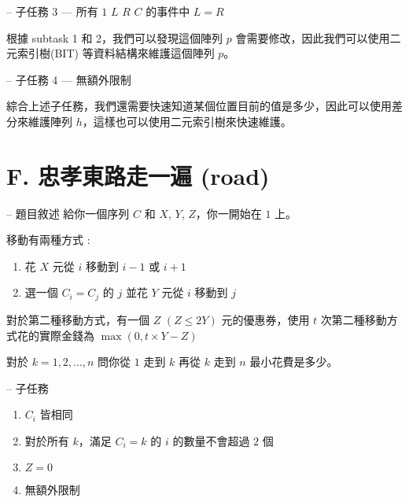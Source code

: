\documentclass[hyperref,UTF8,notheorems,xcolor={dvipsnames}]{beamer}
\newcommand{\btitle}[1]{{\secname} -- #1}
\theoremstyle{definition}
\begin{document}
\begin{frame}[fragile]{\btitle{子任務 3 --- 所有 $1$ $L$ $R$ $C$ 的事件中 $L = R$}}
	
	根據 subtask 1 和 2，我們可以發現這個陣列 $p$ 會需要修改，因此我們可以使用二元索引樹(BIT) 等資料結構來維護這個陣列 $p$。 

\end{frame}

\begin{frame}[fragile]{\btitle{子任務 4 --- 無額外限制}}
	
	綜合上述子任務，我們還需要快速知道某個位置目前的值是多少，因此可以使用差分來維護陣列 $h$，這樣也可以使用二元索引樹來快速維護。

\end{frame}


\section{F. 忠孝東路走一遍 (road)}

\begin{frame}[fragile]{\btitle{題目敘述}}
	給你一個序列 $C$ 和 $X$, $Y$, $Z$，你一開始在 $1$ 上。

	移動有兩種方式 : 

	\begin{enumerate}
		\item 花 $X$ 元從 $i$ 移動到 $i - 1$ 或 $i + 1$ \\
		\item 選一個 $C_i = C_j$ 的 $j$ 並花 $Y$ 元從 $i$ 移動到 $j$
	\end{enumerate}

	對於第二種移動方式，有一個 $Z$ $(Z \le 2 Y)$ 元的優惠券，使用 $t$ 次第二種移動方式花的實際金錢為 $\max(0, t \times Y - Z)$

	對於 $k = 1, 2, ..., n$ 問你從 $1$ 走到 $k$ 再從 $k$ 走到 $n$ 最小花費是多少。
\end{frame}

\begin{frame}[fragile]{\btitle{子任務}}
	\begin{enumerate}
		\item $C_i$ 皆相同
		\item 對於所有 $k$，滿足 $C_i = k$ 的 $i$ 的數量不會超過 $2$ 個
		\item $Z = 0$
		\item 無額外限制
	\end{enumerate}
\end{frame}
\end{document}
